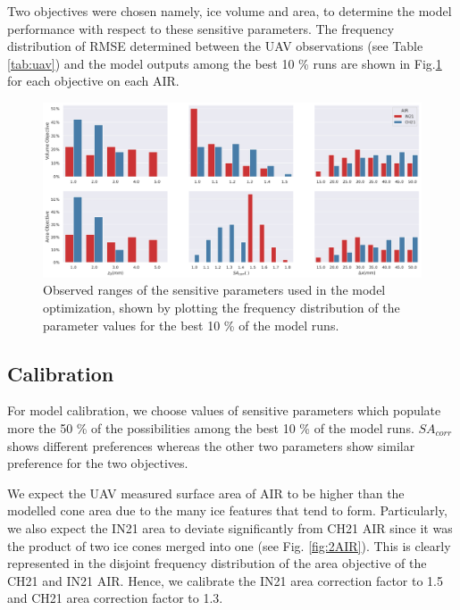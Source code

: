 \documentclass[utf8]{frontiersSCNS} %
\begin{document}
Two objectives were chosen namely, ice volume and area, to determine the model performance with respect to these
sensitive parameters. The frequency distribution  of RMSE determined between the UAV observations (see Table
\ref{tab:uav}) and the model outputs among the best 10 \% runs are shown in Fig.\ref{fig:param_hist} for each
objective on each AIR.

\begin{figure}
	\begin{center}
		\includegraphics[width=\linewidth]{Figures/param_hist.jpg}
	\end{center}
	\caption{Observed ranges of the sensitive parameters used in the model optimization, shown by
		plotting the frequency distribution of the parameter values for the best 10 \% of the model runs. }
	\label{fig:param_hist} \end{figure}



\subsection{Calibration}
For model calibration, we choose values of sensitive parameters which populate more the 50 \% of the possibilities
among the best 10 \% of the model runs. $SA_{corr}$ shows different preferences whereas the other two parameters show similar preference for the two
objectives.

We expect the UAV measured surface area of AIR to be higher than the modelled cone area due to the many
ice features that tend to form. Particularly, we also expect the IN21 area to deviate significantly from CH21 AIR
since it was the product of two ice cones merged into one (see Fig. \ref{fig:2AIR}). This is clearly represented in
the disjoint frequency distribution of the area objective of the CH21 and IN21 AIR. Hence, we calibrate the IN21
area correction factor to 1.5 and CH21 area correction factor to 1.3.
\end{document}
